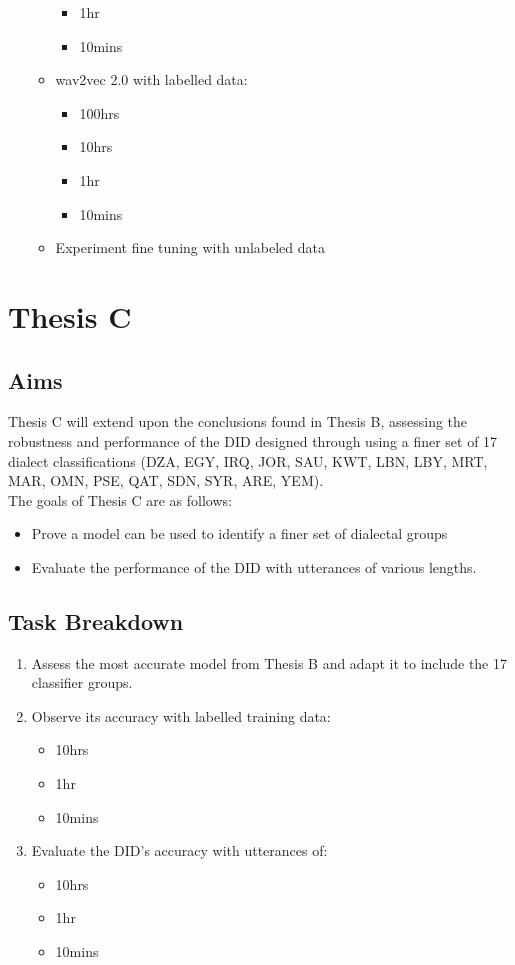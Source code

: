 \begin{enumerate}
\begin{itemize}
\begin{itemize}
            \item 1hr 
            \item 10mins
        \end{itemize} 
        \item wav2vec 2.0 with labelled data: 
        \begin{itemize}
            \item 100hrs
            \item 10hrs 
            \item 1hr 
            \item 10mins
        \end{itemize} 
        \item Experiment fine tuning with unlabeled data
    \end{itemize}
\end{enumerate}

\section{Thesis C}
\subsection{Aims}
Thesis C will extend upon the conclusions found in Thesis B, assessing the robustness and performance of 
the DID designed through using a finer set of 17 dialect classifications 
(DZA, EGY, IRQ, JOR, SAU, KWT, LBN, LBY, MRT, MAR, OMN, PSE, QAT, SDN, SYR, ARE, YEM).\\
The goals of Thesis C are as follows: 
\begin{itemize}
    \item Prove a model can be used to identify a finer set of dialectal groups 
    \item Evaluate the performance of the DID with utterances of various lengths.  
\end{itemize}
\subsection{Task Breakdown}

\begin{enumerate}
\item Assess the most accurate model from Thesis B and adapt it to include the 17 classifier groups.
\item Observe its accuracy with labelled training data:
    \begin{itemize}
        \item 10hrs 
        \item 1hr 
        \item 10mins
    \end{itemize}
\item Evaluate the DID's accuracy with utterances of:
    \begin{itemize}
        \item 10hrs 
        \item 1hr 
        \item 10mins
    \end{itemize}
\end{enumerate}


